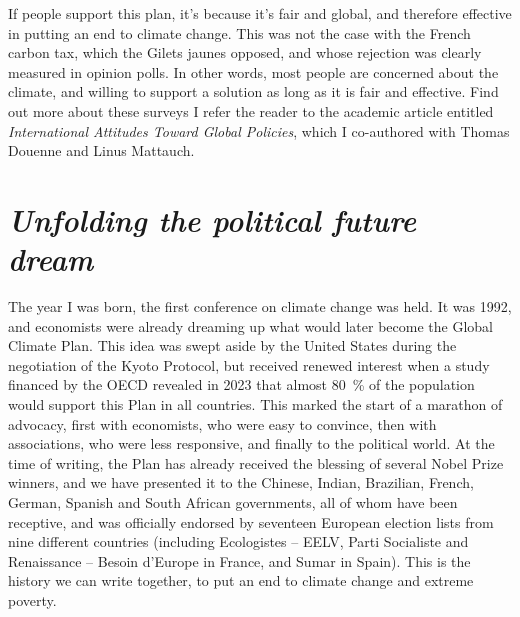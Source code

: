 \documentclass[a5paper,french,openany]{memoir}
\begin{document}
If people support this plan, it's because it's fair and global, and therefore effective in putting an end to climate change. This was not the case with the French carbon tax, which the Gilets jaunes opposed, and whose rejection was clearly measured in opinion polls. In other words, most people are concerned about the climate, and willing to support a solution as long as it is fair and effective. 
Find out more about these surveys%
I refer the reader to the academic article entitled \textit{International Attitudes Toward Global Policies}, which I co-authored with Thomas Douenne and Linus Mattauch. 

\chapter*{\textit{Unfolding the political future dream}}\label{ch:narr_reve}

The year I was born, the first conference on climate change was held. It was 1992, and economists were already dreaming up what would later become the Global Climate Plan. This idea was swept aside by the United States during the negotiation of the Kyoto Protocol, but received renewed interest when a study financed by the OECD revealed in 2023 that almost 80~\% of the population would support this Plan in all countries. This marked the start of a marathon of advocacy, first with economists, who were easy to convince, then with associations, who were less responsive, 
and finally to the political world. At the time of writing, the Plan has already received the blessing of several Nobel Prize winners, and we have presented it to the Chinese, Indian, Brazilian, French, German, Spanish and South African governments, all of whom have been receptive, %
and was officially endorsed by seventeen European election lists from nine different countries (including Ecologistes -- EELV, Parti Socialiste and Renaissance -- Besoin d'Europe in France, and Sumar in Spain). 
This is the history we can write together, to put an end to climate change and extreme poverty. 
\end{document}
